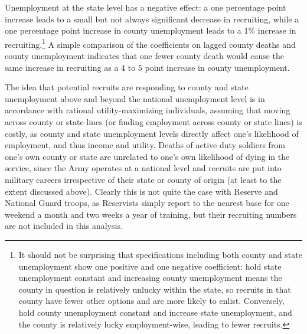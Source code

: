 \documentclass[12pt] {article}
\begin{document}
Unemployment at the state level has a negative effect: a one percentage point increase leads to a small but not always significant decrease in recruiting,
while a one percentage point increase in county unemployment leads
to a 1\% increase in recruiting.\footnote{It should not be surprising that specifications including both county and state unemployment show one positive and one negative coefficient: hold state unemployment constant and increasing county unemployment means the county in question is relatively unlucky within the state, so recruits in that county have fewer other options and are more likely to enlist. Conversely, hold county unemployment constant and increase state unemployment, and the county is relatively lucky employment-wise, leading to fewer recruits.}  A simple comparison of the coefficients on lagged county deaths and county unemployment indicates that one fewer county death would cause the same increase in recruiting as
a 4 to 5 point increase in county unemployment. 



The idea that potential recruits are responding to county and state
unemployment above and beyond the national unemployment level is in
accordance with rational utility-maximizing individuals, assuming
that moving across county or state lines (or finding employment across
county or state lines) is costly, as county and state unemployment
levels directly affect one's likelihood of employment, and thus income
and utility. Deaths of active duty soldiers from one's own county
or state are unrelated to one's own likelihood of dying in the service,
since the Army operates at a national level and recruits are put into
military careers irrespective of their state or county of origin (at
least to the extent discussed above). Clearly this is not quite the
case with Reserve and National Guard troops, as Reservists simply
report to the nearest base for one weekend a month and two weeks
a year of training, but their recruiting numbers are not included
in this analysis.
\end{document}
